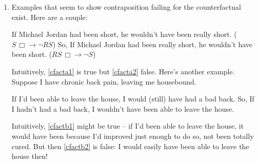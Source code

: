 {{\begin{enumerate}
\begin{enumerate}
	\item Examples that seem to show contraposition failing for the counterfactual exist. Here are a couple: \begin{exe}
\ex		\begin{xlist}
			\ex If Michael Jordan had been short, he wouldn't have been really short. \label{cfacta1} ($S\, \Box\!\!\rightarrow ¬RS$)
			\ex So, If Michael Jordan had been really short, he wouldn't have been short. \label{cfacta2} ($RS\, \Box\!\!\rightarrow ¬S$)
		\end{xlist}
	\end{exe}
	 Intuitively, \eqref{cfacta1} is true but \eqref{cfacta2} false. Here's another example. Suppose I have chronic back pain, leaving me housebound.
	\begin{exe}
		\ex \begin{xlist}
			\ex If I'd been able to leave the house, I would (still) have had a bad back. \label{cfactb1}
			\ex So, If I hadn't had a bad back, I wouldn't have been able to leave the house. \label{cfactb2}
		\end{xlist}
	\end{exe}
Intuitively, \eqref{cfactb1} might be true – if I'd been able to leave the house, it would have been because I'd improved just enough to do so, not been totally cured. But then \eqref{cfactb2} is false: I would easily have been able to leave the house then!


\end{enumerate}
\end{enumerate}}}
